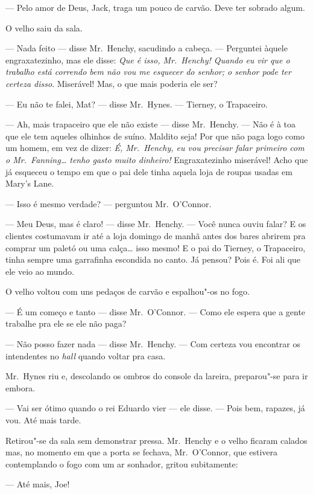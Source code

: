 --- Pelo amor de Deus, Jack, traga um pouco de carvão.  Deve ter sobrado algum.

O velho saiu da sala.

--- Nada feito --- disse Mr.~Henchy, sacudindo a cabeça.  --- Perguntei àquele
engraxatezinho, mas ele disse: \textit{Que é isso, Mr.~Henchy!
Quando eu vir que o trabalho está correndo bem não vou me esquecer do
senhor; o senhor pode ter certeza disso}.  Miserável!  Mas, o que mais
poderia ele ser?

--- Eu não te falei, Mat? --- disse Mr.~Hynes.  --- Tierney, o Trapaceiro.

--- Ah, mais trapaceiro que ele não existe --- disse Mr.~Henchy.  --- Não é à
toa que ele tem aqueles olhinhos de suíno.  Maldito seja!  Por que não paga
logo como um homem, em vez de dizer: \textit{É, Mr.~Henchy, eu vou
precisar falar primeiro com o Mr.~Fanning\ldots{} tenho gasto muito
dinheiro!} Engraxatezinho miserável!  Acho que já esqueceu o tempo em que o pai
dele tinha aquela loja de roupas usadas em Mary’s Lane.

--- Isso é mesmo verdade? --- perguntou Mr.~O’Connor.

--- Meu Deus, mas é claro! --- disse Mr.~Henchy.  --- Você nunca ouviu falar?
E os clientes costumavam ir até a loja domingo de manhã antes dos bares abrirem
pra comprar um paletó ou uma calça\ldots{} isso mesmo!  E o pai do Tierney, o
Trapaceiro, tinha sempre uma garrafinha escondida no canto.  Já pensou?  Pois
é.  Foi ali que ele veio ao mundo.

O velho voltou com uns pedaços de carvão e espalhou"-os no fogo.

--- É um começo e tanto --- disse Mr.~O’Connor.  --- Como ele espera que a
gente trabalhe pra ele se ele não paga?

--- Não posso fazer nada --- disse Mr.~Henchy.  --- Com certeza vou encontrar
os intendentes no \textit{hall} quando voltar pra casa.

Mr.~Hynes riu e, descolando os ombros do console da lareira, preparou"-se para
ir embora.

--- Vai ser ótimo quando o rei Eduardo vier --- ele disse.  --- Pois bem,
rapazes, já vou.  Até mais tarde.

Retirou"-se da sala sem demonstrar pressa.  Mr.~Henchy e o velho ficaram calados
mas, no momento em que a porta se fechava, Mr.~O’Connor, que estivera
contemplando o fogo com um ar sonhador, gritou subitamente:

--- Até mais, Joe!

